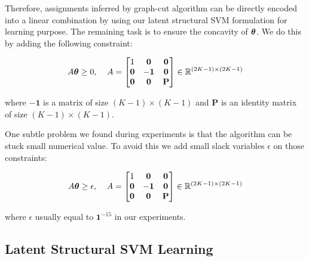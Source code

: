 Therefore, assignments inferred by graph-cut algorithm can be
directly encoded into a linear combination by using our latent
structural SVM formulation for learning purpose. The remaining
task is to ensure the concavity of $\boldsymbol{\theta}$. We do this by
adding the following constraint:

\begin{align}
  A\boldsymbol{\theta}\geq0 \text{,\;~~~} A=
                  \begin{bmatrix}
                    1 & \mathbf{0} & \mathbf{0}\\
                    \mathbf{0} & -\mathbf{1} & \mathbf{0}\\
                    \mathbf{0} & \mathbf{0} & \mathbf{P}
                  \end{bmatrix}\in \mathbb{R}^{(2K-1)\times(2K-1)}
\end{align}

\noindent where $-\mathbf{1}$ is a matrix of size $(K-1)\times(K-1)$ and
$\mathbf{P}$ is an identity matrix of size $(K-1)\times(K-1)$.

One subtle problem we found during experiments is that the
algorithm can be stuck small numerical value. To avoid this we
add small slack variables $\epsilon$ on those constraints:

\begin{align}
  \label{eq:concave_constraint}
  A\boldsymbol{\theta}\geq\epsilon \text{,\;~~~} A=
                  \begin{bmatrix}
                    1 & \mathbf{0} & \mathbf{0}\\
                    \mathbf{0} & -\mathbf{1} & \mathbf{0}\\
                    \mathbf{0} & \mathbf{0} & \mathbf{P}
                  \end{bmatrix}\in \mathbb{R}^{(2K-1)\times(2K-1)}
\end{align}

\noindent where $\epsilon$ usually equal to $\mathbf{1}^{-15}$ in our
experiments.

\subsection{Latent Structural SVM Learning}
\label{sec:mrflssvm_learning_algo}

